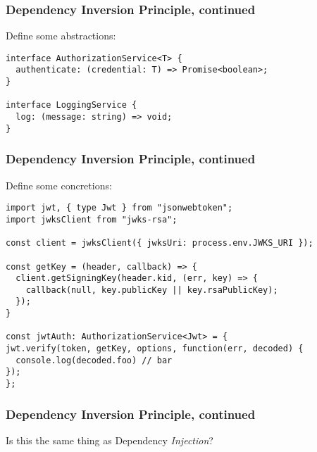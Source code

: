 \documentclass[aspectratio=169]{beamer}
\begin{document}
\begin{frame}[fragile]
  \frametitle{Dependency Inversion Principle, continued}
  Define some abstractions:

  \vspace{1em}

  \begin{verbatim}
interface AuthorizationService<T> {
  authenticate: (credential: T) => Promise<boolean>;
}

interface LoggingService {
  log: (message: string) => void;
}
\end{verbatim}
\end{frame}

\begin{frame}[fragile]
  \frametitle{Dependency Inversion Principle, continued}
  Define some concretions:

  \vspace{1em}

  \begin{verbatim}
import jwt, { type Jwt } from "jsonwebtoken";
import jwksClient from "jwks-rsa";

const client = jwksClient({ jwksUri: process.env.JWKS_URI });

const getKey = (header, callback) => {
  client.getSigningKey(header.kid, (err, key) => {
    callback(null, key.publicKey || key.rsaPublicKey);
  });
}

const jwtAuth: AuthorizationService<Jwt> = {
jwt.verify(token, getKey, options, function(err, decoded) {
  console.log(decoded.foo) // bar
});
};
  \end{verbatim}
\end{frame}

\begin{frame}
  \frametitle{Dependency Inversion Principle, continued}
  Is this the same thing as Dependency \textit{Injection}?
\end{frame}
\end{document}
